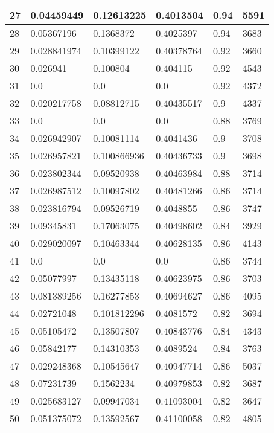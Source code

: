 \begin{longtable}{|l|l|l|l|l|l|}
27 & 0.04459449 & 0.12613225 & 0.4013504 & 0.94 & 5591 \\ \hline 
28 & 0.05367196 & 0.1368372 & 0.4025397 & 0.94 & 3683 \\ \hline 
29 & 0.028841974 & 0.10399122 & 0.40378764 & 0.92 & 3660 \\ \hline 
30 & 0.026941 & 0.100804 & 0.404115 & 0.92 & 4543 \\ \hline 
31 & 0.0 & 0.0 & 0.0 & 0.92 & 4372 \\ \hline 
32 & 0.020217758 & 0.08812715 & 0.40435517 & 0.9 & 4337 \\ \hline 
33 & 0.0 & 0.0 & 0.0 & 0.88 & 3769 \\ \hline 
34 & 0.026942907 & 0.10081114 & 0.4041436 & 0.9 & 3708 \\ \hline 
35 & 0.026957821 & 0.100866936 & 0.40436733 & 0.9 & 3698 \\ \hline 
36 & 0.023802344 & 0.09520938 & 0.40463984 & 0.88 & 3714 \\ \hline 
37 & 0.026987512 & 0.10097802 & 0.40481266 & 0.86 & 3714 \\ \hline 
38 & 0.023816794 & 0.09526719 & 0.4048855 & 0.86 & 3747 \\ \hline 
39 & 0.09345831 & 0.17063075 & 0.40498602 & 0.84 & 3929 \\ \hline 
40 & 0.029020097 & 0.10463344 & 0.40628135 & 0.86 & 4143 \\ \hline 
41 & 0.0 & 0.0 & 0.0 & 0.86 & 3744 \\ \hline 
42 & 0.05077997 & 0.13435118 & 0.40623975 & 0.86 & 3703 \\ \hline 
43 & 0.081389256 & 0.16277853 & 0.40694627 & 0.86 & 4095 \\ \hline 
44 & 0.02721048 & 0.101812296 & 0.4081572 & 0.82 & 3694 \\ \hline 
45 & 0.05105472 & 0.13507807 & 0.40843776 & 0.84 & 4343 \\ \hline 
46 & 0.05842177 & 0.14310353 & 0.4089524 & 0.84 & 3763 \\ \hline 
47 & 0.029248368 & 0.10545647 & 0.40947714 & 0.86 & 5037 \\ \hline 
48 & 0.07231739 & 0.1562234 & 0.40979853 & 0.82 & 3687 \\ \hline 
49 & 0.025683127 & 0.09947034 & 0.41093004 & 0.82 & 3647 \\ \hline 
50 & 0.051375072 & 0.13592567 & 0.41100058 & 0.82 & 4805 \\ \hline 
\end{longtable}